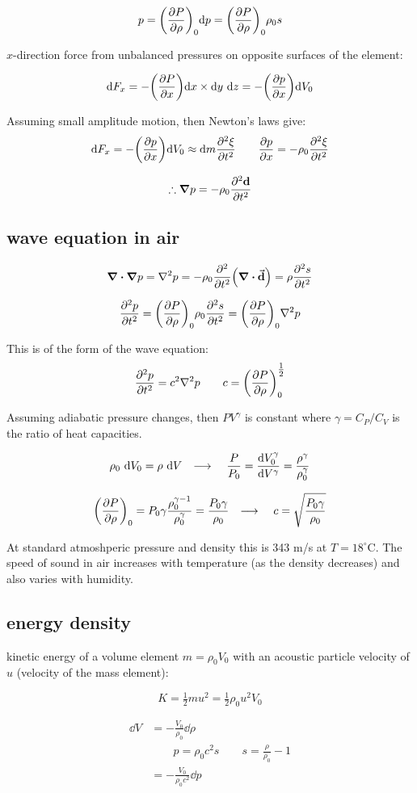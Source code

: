 \documentclass[10pt, a4paper, twocolumn]{article}
\newcommand{\arr}{\ensuremath{\longrightarrow\ }}
\begin{document}
\[p = \qty(\pdv{P}{\rho})_0\dd p = \qty(\pdv{P}{\rho})_0
\rho _0 s \]

$x$-direction force from unbalanced pressures on opposite surfaces of the element:

\[\dd F_x = -\qty(\pdv{P}{x})\dd x \times \dd y\ \dd z
=-\qty(\pdv{p}{x})\dd V_0 \]

Assuming small amplitude motion, then Newton's laws give:
\[\dd F_x = -\qty(\pdv{p}{x})\dd V_0
\approx \dd m \pdv[2]{\xi}{t}
\qquad \pdv{p}{x}=-\rho _0 \pdv[2]{\xi}{t} \]

\[\therefore \grad p = -\rho _0\pdv[2]{\vb d}{t} \]

\subsection{wave equation in air}

\[\div{\grad p} = \laplacian{p}=-\rho _0
\pdv[2]{t}\qty(\div{\va d})
= \rho \pdv[2]{s}{t} \]

\[\pdv[2]{p}{t} = \qty(\pdv{P}{\rho})_0\rho _0
\pdv[2]{s}{t} = \qty(\pdv{P}{\rho})_0\laplacian p \]

This is of the form of the wave equation:
\[\pdv[2]{p}{t} = c^2\laplacian p
\qquad c = \qty(\pdv{P}{\rho})_0^{\tfrac12} \]

Assuming adiabatic pressure changes, then $PV^\gamma$ is constant where $\gamma = C_P/C_V$ is the ratio of heat capacities.

\[\rho _0\ \dd V_0 = \rho \ \dd V
\qq{\arr} \frac{P}{P_0}=\dv{V_0^\gamma}{V^\gamma}
= \frac{\rho ^\gamma}{\rho _0^\gamma} \]

\[\qty(\pdv{P}{\rho})_0=P_0\gamma
\frac{\rho_0^{\gamma -1}}{\rho _0^\gamma}
=\frac{P_0\gamma}{\rho _0}
\qq{\arr} c= \sqrt{\frac{P_0\gamma}{\rho _0}} \]

At standard atmoshperic pressure and density this is 343 m/s at $T=18^\circ \text{C}$. The speed of sound in air increases with temperature (as the density decreases) and also varies with humidity.

\subsection{energy density}

kinetic energy of a volume element $m=\rho _0V_0$ with an acoustic particle velocity of $u$ (velocity of the mass element):

\[K =\tfrac12 mu^2 = \tfrac12 \rho _0u^2V_0\]


\begin{equation*}
\begin{aligned}
\dd V &= -\frac{V_0}{\rho _0} \dd \rho
\\&\qquad p = \rho _0c^2s \qquad s = \frac{\rho}{\rho _0}-1
\\&=-\frac{V_0}{\rho _0c^2}\dd p
\end{aligned}
\end{equation*}
\end{document}
